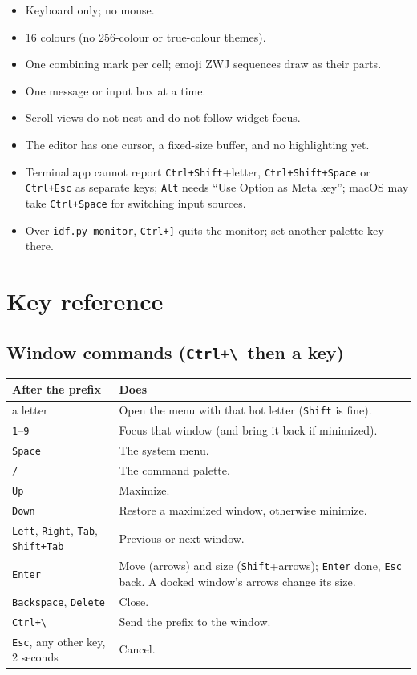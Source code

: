 \documentclass[11pt,a4paper]{article}
\newcommand{\key}[1]{\texttt{#1}}
\newcommand{\bs}{\textbackslash}
\newcommand{\prefix}{\key{Ctrl+\bs}}
\begin{document}
\begin{itemize}
\item Keyboard only; no mouse.
\item 16 colours (no 256-colour or true-colour themes).
\item One combining mark per cell; emoji ZWJ sequences draw as their parts.
\item One message or input box at a time.
\item Scroll views do not nest and do not follow widget focus.
\item The editor has one cursor, a fixed-size buffer, and no highlighting yet.
\item Terminal.app cannot report \key{Ctrl+Shift}+letter, \key{Ctrl+Shift+Space}
  or \key{Ctrl+Esc} as separate keys; \key{Alt} needs ``Use Option as Meta
  key''; macOS may take \key{Ctrl+Space} for switching input sources.
\item Over \texttt{idf.py monitor}, \key{Ctrl+]} quits the monitor; set another
  palette key there.
\end{itemize}

\appendix

\section{Key reference}
\label{app:keys}

\subsection{Window commands (\prefix\ then a key)}

\begin{longtable}{@{}p{}p{}@{}}
\toprule
\textbf{After the prefix} & \textbf{Does} \\
\midrule
\endhead
a letter & Open the menu with that hot letter (\key{Shift} is fine). \\
\key{1}--\key{9} & Focus that window (and bring it back if minimized). \\
\key{Space} & The system menu. \\
\key{/} & The command palette. \\
\key{Up} & Maximize. \\
\key{Down} & Restore a maximized window, otherwise minimize. \\
\key{Left}, \key{Right}, \key{Tab}, \key{Shift+Tab} & Previous or next
  window. \\
\key{Enter} & Move (arrows) and size (\key{Shift}+arrows); \key{Enter} done,
  \key{Esc} back. A docked window's arrows change its size. \\
\key{Backspace}, \key{Delete} & Close. \\
\prefix & Send the prefix to the window. \\
\key{Esc}, any other key, 2 seconds & Cancel. \\
\bottomrule
\end{longtable}
\end{document}

